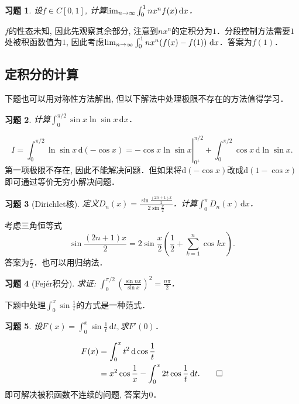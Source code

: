 \documentclass[11pt,a4paper]{ctexart}
\makeatletter
\theoremstyle{thmseries} %
\theoremstyle{exerseries}
\newtheorem{exer}{习题}[section]
\renewenvironment{proof}[1][\proofname]{\par
  \pushQED{\qed}%
  \normalfont \topsep6\p@\@plus6\p@\relax
  \trivlist
  \item[\hskip\labelsep
        \itshape
    #1\@addpunct{}]\ignorespaces
}{%
  \popQED\endtrivlist\@endpefalse
}
\newenvironment{sol}{\begin{proof}[\bfseries\upshape 解\quad]}{\end{proof}}
\newcommand{\bra}[1]{\mathopen{}\left(#1\right)}
\renewcommand{\d}{\mathrm{d}}
\def \nti {\mathnormal{n}\to\infty}
\makeatother
\begin{document}
\begin{exer}
	设$f\in C[0,1]$, 计算$\lim_{\nti}\int_{0}^{1}nx^nf(x)\,\d x$．
\end{exer}
\begin{sol}
	$f$的性态未知, 因此先观察其余部分, 注意到$nx^n$的定积分为$1$．分段控制方法需要$1$处被积函数值为$1$, 因此考虑$\lim_{\nti}\int_{0}^{1}nx^n\bra{f(x)-f(1)}\,\d x$．答案为$f(1)$．
\end{sol}


\subsection{定积分的计算}
下题也可以用对称性方法解出, 但以下解法中处理极限不存在的方法值得学习．
\begin{exer}
	计算$\int_{0}^{\pi/2}\sin x\ln\sin x\,\d x$．
\end{exer}
\begin{sol}
	\[\left.I=\int_{0}^{\pi/2}\ln\sin x\,\d(-\cos x)=-\cos x\ln\sin x\right|_{0^+}^{\pi/2}+\int_{0}^{\pi/2}\cos x\,\d\ln\sin x.\]
	第一项极限不存在, 因此不能解决问题．但如果将$\d(-\cos x)$改成$\d(1-\cos x)$即可通过等价无穷小解决问题．
\end{sol}

\begin{exer}[Dirichlet核]
	定义$D_n(x)=\frac{\sin\frac{(2n+1)x}{2}}{2\sin\frac{x}{2}}$．计算$\int_{0}^{\pi}D_n(x)\,\d x$．
\end{exer}
\begin{sol}
	考虑三角恒等式
	\[\sin\frac{(2n+1)x}{2}=2\sin\frac{x}{2}\bra{\frac{1}{2}+\sum_{k=1}^{n}\cos kx}.\]
	答案为$\frac{\pi}{2}$．也可以用归纳法．
\end{sol}

\begin{exer}[Fejér积分]
	求证: $\int_{0}^{\pi/2}\bra{\frac{\sin nx}{\sin x}}^2=\frac{n\pi}{2}$．
\end{exer}

下题中处理$\int_{0}^{x}\sin\frac{1}{t}$的方式是一种范式．
\begin{exer}
	设$F(x)=\int_{0}^{x}\sin\frac{1}{t}\,\d t,$求$F'(0)$．
\end{exer}
\begin{sol}
	\begin{align*}
		F(x)&=\int_{0}^{x}t^2\,\d\cos\frac{1}{t}\\
		&=x^2\cos\frac{1}{x}-\int_{0}^{x}2t\cos\frac{1}{t}\,\d t.\qedhere
	\end{align*}
	即可解决被积函数不连续的问题, 答案为$0$．
\end{sol}
\end{document}
